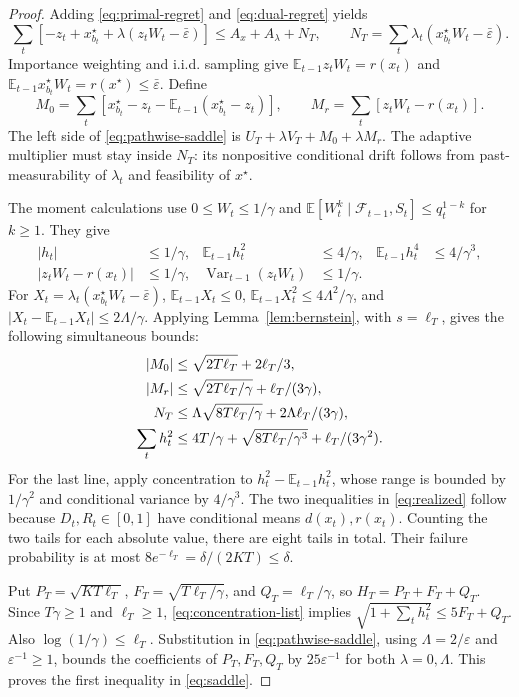 \documentclass[11pt]{article}
\theoremstyle{remark}
\newcommand{\E}{\mathbb E}
\newcommand{\calF}{\mathcal F}
\newcommand{\eps}{\varepsilon}
\begin{document}
\begin{proof}
Adding \eqref{eq:primal-regret} and \eqref{eq:dual-regret} yields
\begin{equation}
 \sum_t[-z_t+x^\star_{b_t}+\lambda(z_tW_t-\bar\eps)]
 \le A_x+A_\lambda+N_T,\qquad
 N_T=\sum_t\lambda_t(x^\star_{b_t}W_t-\bar\eps).
 \label{eq:pathwise-saddle}
\end{equation}
Importance weighting and i.i.d. sampling give
$\E_{t-1}z_tW_t=r(x_t)$ and
$\E_{t-1}x^\star_{b_t}W_t=r(x^\star)\le\bar\eps$.
Define
\[
 M_0=\sum_t[x^\star_{b_t}-z_t-\E_{t-1}(x^\star_{b_t}-z_t)],
 \qquad M_r=\sum_t[z_tW_t-r(x_t)].
\]
The left side of \eqref{eq:pathwise-saddle} is
$U_T+\lambda V_T+M_0+\lambda M_r$.
The adaptive multiplier must stay inside $N_T$: its nonpositive
conditional drift follows from past-measurability of $\lambda_t$ and
feasibility of $x^\star$.

The moment calculations use $0\le W_t\le1/\gamma$ and
$\E[W_t^k\mid\calF_{t-1},S_t]\le q_t^{1-k}$ for $k\ge1$.
They give
\begin{align*}
 |h_t|&\le1/\gamma,&
 \E_{t-1}h_t^2&\le4/\gamma,&
 \E_{t-1}h_t^4&\le4/\gamma^3,\\
 |z_tW_t-r(x_t)|&\le1/\gamma,&
 \operatorname{Var}_{t-1}(z_tW_t)&\le1/\gamma.
\end{align*}
For $X_t=\lambda_t(x^\star_{b_t}W_t-\bar\eps)$,
$\E_{t-1}X_t\le0$, $\E_{t-1}X_t^2\le4\Lambda^2/\gamma$,
and $|X_t-\E_{t-1}X_t|\le2\Lambda/\gamma$.
Applying Lemma~\ref{lem:bernstein}, with $s=\ell_T$, gives the
following simultaneous bounds:
\begin{align}
 |M_0|&\le\sqrt{2T\ell_T}+2\ell_T/3,\notag\\
 |M_r|&\le\sqrt{2T\ell_T/\gamma}+\ell_T/(3\gamma),\notag\\
 N_T&\le\Lambda\sqrt{8T\ell_T/\gamma}
                      +2\Lambda\ell_T/(3\gamma),\notag\\
 \sum_th_t^2&\le4T/\gamma+\sqrt{8T\ell_T/\gamma^3}
                                 +\ell_T/(3\gamma^2).
 \label{eq:concentration-list}
\end{align}
For the last line, apply concentration to
$h_t^2-\E_{t-1}h_t^2$, whose range is bounded by $1/\gamma^2$
and conditional variance by $4/\gamma^3$. The two inequalities
in \eqref{eq:realized} follow because $D_t,R_t\in[0,1]$ have
conditional means $d(x_t),r(x_t)$. Counting the two tails for each
absolute value, there are eight tails in total. Their failure probability
is at most $8e^{-\ell_T}=\delta/(2KT)\le\delta$.

Put $P_T=\sqrt{KT\ell_T}$, $F_T=\sqrt{T\ell_T/\gamma}$, and
$Q_T=\ell_T/\gamma$, so $H_T=P_T+F_T+Q_T$.
Since $T\gamma\ge1$ and $\ell_T\ge1$,
\eqref{eq:concentration-list} implies
$\sqrt{1+\sum_th_t^2}\le5F_T+Q_T$.
Also $\log(1/\gamma)\le\ell_T$.
Substitution in \eqref{eq:pathwise-saddle}, using
$\Lambda=2/\eps$ and $\eps^{-1}\ge1$, bounds the coefficients
of $P_T,F_T,Q_T$ by $25\eps^{-1}$ for both $\lambda=0,\Lambda$.
This proves the first inequality in \eqref{eq:saddle}.


\end{proof}
\end{document}
